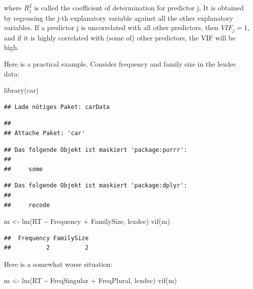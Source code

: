 \documentclass[
  12pt,
]{krantz}
\newenvironment{Shaded}{\begin{snugshade}}{\end{snugshade}}
\newcommand{\FunctionTok}[1]{\textcolor[rgb]{0.00,0.00,0.00}{#1}}
\newcommand{\NormalTok}[1]{#1}
\newcommand{\OtherTok}[1]{\textcolor[rgb]{0.56,0.35,0.01}{#1}}
\newcommand{\SpecialCharTok}[1]{\textcolor[rgb]{0.00,0.00,0.00}{#1}}
\theoremstyle{definition}
\theoremstyle{definition}
\theoremstyle{definition}
\theoremstyle{definition}
\theoremstyle{remark}
\begin{document}
where \(R_j^2\) is called the coefficient of determination for predictor j.
It is obtained by regressing the j-th explanatory variable against all the
other explanatory variables.
If a predictor j is uncorrelated with all other predictors, then \(VIF_j=1\), and
if it is highly correlated with (some of) other predictors, the VIF will be high.

Here is a practical example.
Consider frequency and family size in the lexdec data:

\begin{Shaded}
\begin{Highlighting}[]
\FunctionTok{library}\NormalTok{(car)}
\end{Highlighting}
\end{Shaded}

\begin{verbatim}
## Lade nötiges Paket: carData
\end{verbatim}

\begin{verbatim}
## 
## Attache Paket: 'car'
\end{verbatim}

\begin{verbatim}
## Das folgende Objekt ist maskiert 'package:purrr':
## 
##     some
\end{verbatim}

\begin{verbatim}
## Das folgende Objekt ist maskiert 'package:dplyr':
## 
##     recode
\end{verbatim}

\begin{Shaded}
\begin{Highlighting}[]
\NormalTok{m }\OtherTok{\textless{}{-}} \FunctionTok{lm}\NormalTok{(RT }\SpecialCharTok{\textasciitilde{}}\NormalTok{ Frequency }\SpecialCharTok{+}\NormalTok{ FamilySize, lexdec)}
\FunctionTok{vif}\NormalTok{(m)}
\end{Highlighting}
\end{Shaded}

\begin{verbatim}
##  Frequency FamilySize 
##          2          2
\end{verbatim}

Here is a somewhat worse situation:

\begin{Shaded}
\begin{Highlighting}[]
\NormalTok{m }\OtherTok{\textless{}{-}} \FunctionTok{lm}\NormalTok{(RT }\SpecialCharTok{\textasciitilde{}}\NormalTok{ FreqSingular }\SpecialCharTok{+}\NormalTok{ FreqPlural, lexdec)}
\FunctionTok{vif}\NormalTok{(m)}
\end{Highlighting}
\end{Shaded}
\end{document}
